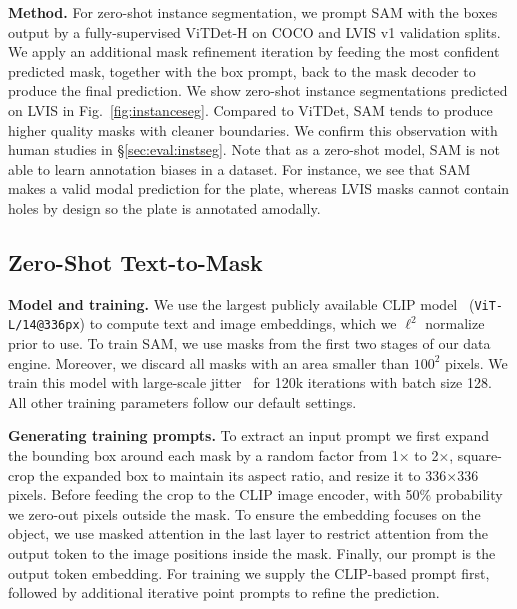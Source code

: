 \documentclass[10pt,twocolumn,letterpaper]{article}
\renewcommand{\paragraph}[1]{\vspace{1.25mm}\noindent\textbf{#1}}
\newcommand{\x}{{\times}}
\newcommand{\sam}{SAM\xspace}
\newcommand{\fig}[1]{Fig.~\ref{#1}}
\begin{document}
\paragraph{Method.} For zero-shot instance segmentation, we prompt \sam with the boxes output by a fully-supervised \mbox{ViTDet-H} on COCO and LVIS v1 validation splits. We apply an additional mask refinement iteration by feeding the most confident predicted mask, together with the box prompt, back to the mask decoder to produce the final prediction. We show zero-shot instance segmentations predicted on LVIS in \fig{fig:instanceseg}. Compared to ViTDet, \sam tends to produce higher quality masks with cleaner boundaries. We confirm this observation with human studies in \S\ref{sec:eval:instseg}. Note that as a zero-shot model, \sam is not able to learn annotation biases in a dataset. For instance, we see that \sam makes a valid modal prediction for the plate, whereas LVIS masks cannot contain holes by design so the plate is annotated amodally.

\subsection{Zero-Shot Text-to-Mask}\label{app:text_to_mask}

\paragraph{Model and training.} We use the largest publicly available CLIP model~\cite{Radford2021} ({\tt ViT-L/14@336px}) to compute text and image embeddings, which we $\ell^2$ normalize prior to use. To train \sam, we use masks from the first two stages of our data engine. Moreover, we discard all masks with an area smaller than $\textrm{100}^\textrm{2}$ pixels. We train this model with large-scale jitter~\cite{Ghiasi2021} for 120k iterations with batch size 128. All other training parameters follow our default settings.

\paragraph{Generating training prompts.} To extract an input prompt we first expand the bounding box around each mask by a random factor from 1$\x$ to 2$\x$, square-crop the expanded box to maintain its aspect ratio, and resize it to 336$\x$336 pixels. Before feeding the crop to the CLIP image encoder, with 50\% probability we zero-out pixels outside the mask. To ensure the embedding focuses on the object, we use masked attention in the last layer to restrict attention from the output token to the image positions inside the mask. Finally, our prompt is the output token embedding. For training we supply the CLIP-based prompt first, followed by additional iterative point prompts to refine the prediction.
\end{document}

